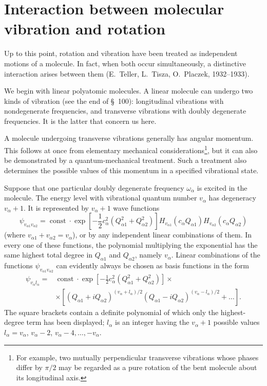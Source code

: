 \section{Interaction between molecular vibration and rotation}

Up to this point, rotation and vibration have been treated as independent motions of a molecule. In fact, when both occur simultaneously, a distinctive interaction arises between them (E.~Teller, L.~Tisza, O.~Placzek, 1932--1933).

We begin with linear polyatomic molecules. A linear molecule can undergo two kinds of vibration (see the end of §~100): longitudinal vibrations with nondegenerate frequencies, and transverse vibrations with doubly degenerate frequencies. It is the latter that concern us here.

A molecule undergoing transverse vibrations generally has angular momentum. This follows at once from elementary mechanical considerations\footnote{For example, two mutually perpendicular transverse vibrations whose phases differ by $\pi/2$ may be regarded as a pure rotation of the bent molecule about its longitudinal axis.}, but it can also be demonstrated by a quantum-mechanical treatment. Such a treatment also determines the possible values of this momentum in a specified vibrational state.

Suppose that one particular doubly degenerate frequency $\omega_\alpha$ is excited in the molecule. The energy level with vibrational quantum number $v_\alpha$ has degeneracy $v_\alpha+1$. It is represented by $v_\alpha+1$ wave functions
\[
 \psi_{v_{\alpha1}v_{\alpha2}}=\operatorname{const}\cdot
 \exp\left[-\frac12c_\alpha^2(Q_{\alpha1}^2+Q_{\alpha2}^2)\right]
 H_{v_{\alpha1}}(c_\alpha Q_{\alpha1})H_{v_{\alpha2}}(c_\alpha Q_{\alpha2})
\]
(where $v_{\alpha1}+v_{\alpha2}=v_\alpha$), or by any independent linear combinations of them. In every one of these functions, the polynomial multiplying the exponential has the same highest total degree in $Q_{\alpha1}$ and $Q_{\alpha2}$, namely $v_\alpha$. Linear combinations of the functions $\psi_{v_{\alpha1}v_{\alpha2}}$ can evidently always be chosen as basis functions in the form
\begin{equation}
 \begin{split}
 \psi_{v_\alpha l_\alpha}={}&\operatorname{const}\cdot
 \exp\left[-\frac12c_\alpha^2(Q_{\alpha1}^2+Q_{\alpha2}^2)\right]\times\\
 &\times\left[(Q_{\alpha1}+iQ_{\alpha2})^{(v_\alpha+l_\alpha)/2}
 (Q_{\alpha1}-iQ_{\alpha2})^{(v_\alpha-l_\alpha)/2}+\ldots\right].
 \end{split}
 \tag{104.1}
\end{equation}
The square brackets contain a definite polynomial of which only the highest-degree term has been displayed; $l_\alpha$ is an integer having the $v_\alpha+1$ possible values $l_\alpha=v_\alpha$, $v_\alpha-2$, $v_\alpha-4,\ldots,-v_\alpha$.

